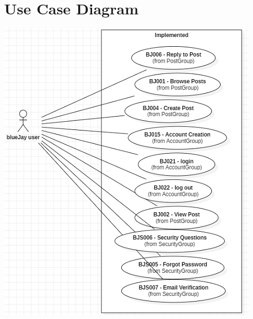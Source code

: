 \documentclass{report}
\begin{document}
\appendix
\chapter{Use Case Diagram}
\includegraphics{UseCaseDiagram}
\end{document}
